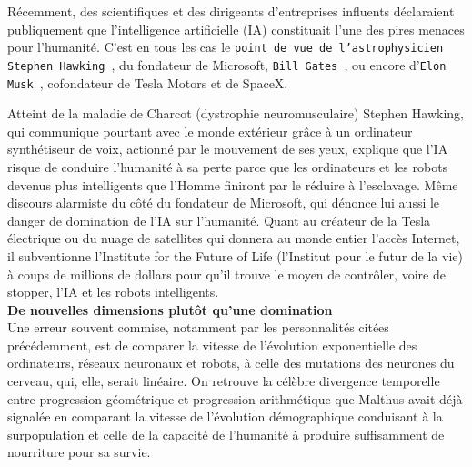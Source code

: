 \documentclass[11pt,twoside,a4paper]{article}
\begin{document}
R{\'e}cemment, des scientifiques et des dirigeants d'entreprises influents d{\'e}claraient publiquement que l'intelligence artificielle (IA) constituait l'une des pires menaces pour l'humanit{\'e}. C'est en tous les cas le \texttt{point de vue de l'astrophysicien Stephen Hawking~\footnotemark}, du fondateur de Microsoft, \texttt{Bill Gates~\footnotemark}, ou encore d'\texttt{Elon Musk~\footnotemark}, cofondateur de Tesla Motors et de SpaceX. ~\\
	
Atteint de la maladie de Charcot (dystrophie neuromusculaire) Stephen Hawking, qui communique pourtant avec le monde ext{\'e}rieur gr{\^a}ce {\`a} un ordinateur synth{\'e}tiseur de voix, actionn{\'e} par le mouvement de ses yeux, explique que l'IA risque de conduire l'humanit{\'e} {\`a} sa perte parce que les ordinateurs et les robots devenus plus intelligents que l'Homme finiront par le r{\'e}duire {\`a} l'esclavage. M{\^e}me discours alarmiste du c{\^o}t{\'e} du fondateur de Microsoft, qui d{\'e}nonce lui aussi le danger de domination de l'IA sur l'humanit{\'e}. Quant au cr{\'e}ateur de la Tesla {\'e}lectrique ou du nuage de satellites qui donnera au monde entier l'acc{\`e}s Internet, il subventionne l'Institute for the Future of Life (l'Institut pour le futur de la vie) {\`a} coups de millions de dollars pour qu'il trouve le moyen de contr{\^o}ler, voire de stopper, l'IA et les robots intelligents. ~\\

\textbf{De nouvelles dimensions plut{\^o}t qu'une domination}~\\

Une erreur souvent commise, notamment par les personnalit{\'e}s cit{\'e}es pr{\'e}c{\'e}demment, est de comparer la vitesse de l'{\'e}volution exponentielle des ordinateurs, r{\'e}seaux neuronaux et robots, {\`a} celle des mutations des neurones du cerveau, qui, elle, serait lin{\'e}aire. On retrouve la c{\'e}l{\`e}bre divergence temporelle entre progression g{\'e}om{\'e}trique et progression arithm{\'e}tique que Malthus avait d{\'e}j{\`a} signal{\'e}e en comparant la vitesse de l'{\'e}volution d{\'e}mographique conduisant {\`a} la surpopulation et celle de la capacit{\'e} de l'humanit{\'e} {\`a} produire suffisamment de nourriture pour sa survie. ~\\
\end{document}
